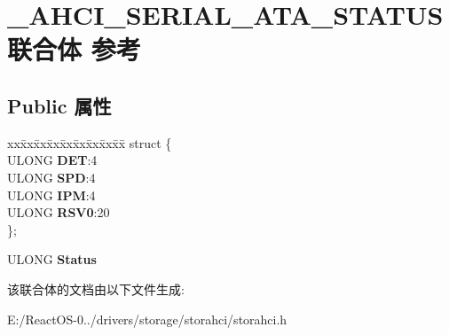 \hypertarget{union___a_h_c_i___s_e_r_i_a_l___a_t_a___s_t_a_t_u_s}{}\section{\+\_\+\+A\+H\+C\+I\+\_\+\+S\+E\+R\+I\+A\+L\+\_\+\+A\+T\+A\+\_\+\+S\+T\+A\+T\+U\+S联合体 参考}
\label{union___a_h_c_i___s_e_r_i_a_l___a_t_a___s_t_a_t_u_s}
\subsection*{Public 属性}
\begin{DoxyCompactItemize}
\item 
\mbox{\label{union___a_h_c_i___s_e_r_i_a_l___a_t_a___s_t_a_t_u_s_adbeddda9e90cfbb8e7fae347a766993c}} 
\begin{tabbing}
xx\=xx\=xx\=xx\=xx\=xx\=xx\=xx\=xx\=\kill
struct \{\\
\>ULONG {\bfseries DET}:4\\
\>ULONG {\bfseries SPD}:4\\
\>ULONG {\bfseries IPM}:4\\
\>ULONG {\bfseries RSV0}:20\\
\}; \\

\end{tabbing}\item 
\mbox{\label{union___a_h_c_i___s_e_r_i_a_l___a_t_a___s_t_a_t_u_s_a6a9c41cd741206a0e54cd7aa80f063b4}} 
U\+L\+O\+NG {\bfseries Status}
\end{DoxyCompactItemize}


该联合体的文档由以下文件生成\+:\begin{DoxyCompactItemize}
\item 
E\+:/\+React\+O\+S-\/0../drivers/storage/storahci/storahci.\+h\end{DoxyCompactItemize}
